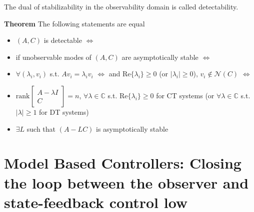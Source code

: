 \documentclass[twoside]{article}
\begin{document}
The dual of stabilizability in the observability domain is called detectability. 

\textbf{Theorem} The following statements are equal 
\begin{itemize}
\item $(A,C)$ is detectable $\iff$
\item if unobservable modes of $(A,C)$ are asymptotically stable $\iff$
\item $\forall (\lambda_i , v_i)$ s.t. $A v_i = \lambda_i v_i$ $\iff$
and $\mathrm{Re}\lbrace \lambda_i \rbrace \geq 0$ (or $|\lambda_i|\geq0$),
$v_i \notin \mathcal{N}(C)$ $\iff$
\item $\mathrm{rank}\left[ \begin{array}{c} A - \lambda I \\ \hline C \end{array} \right] = n$,
$\forall \lambda \in \mathbb{C}$ s.t. $\mathrm{Re}\lbrace \lambda_i \rbrace \geq 0$ for CT systems (or $\forall \lambda \in \mathbb{C}$ s.t. $|\lambda|  \geq 1$ for DT systems)
\item $\exists L$ such that $(A - L C)$ is asymptotically stable
\end{itemize}

\newpage

\section{Model Based Controllers: Closing the loop between the observer and state-feedback control low} 
\end{document}
